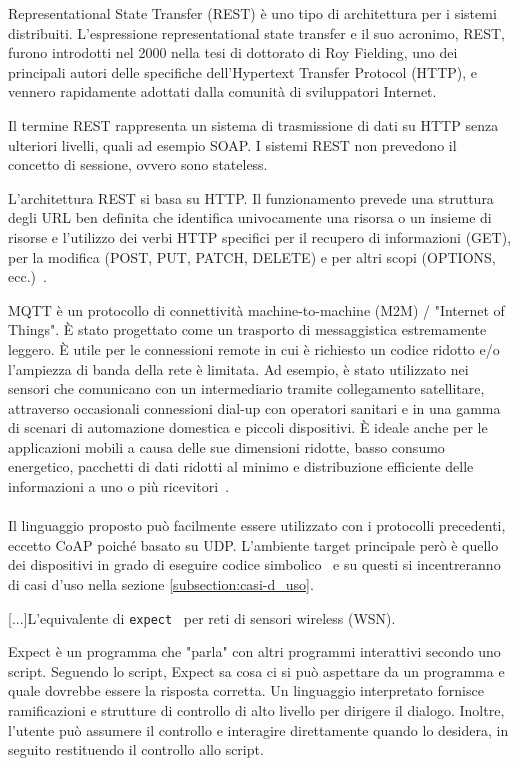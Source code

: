 \documentclass[]{article}
\begin{document}
Representational State Transfer (REST) è uno tipo di architettura per i sistemi distribuiti. L'espressione representational state transfer e il suo acronimo, REST, furono introdotti nel 2000 nella tesi di dottorato di Roy Fielding, uno dei principali autori delle specifiche dell'Hypertext Transfer Protocol (HTTP), e vennero rapidamente adottati dalla comunità di sviluppatori Internet.

Il termine REST rappresenta un sistema di trasmissione di dati su HTTP senza ulteriori livelli, quali ad esempio SOAP. I sistemi REST non prevedono il concetto di sessione, ovvero sono stateless.

L'architettura REST si basa su HTTP. Il funzionamento prevede una struttura degli URL ben definita che identifica univocamente una risorsa o un insieme di risorse e l'utilizzo dei verbi HTTP specifici per il recupero di informazioni (GET), per la modifica (POST, PUT, PATCH, DELETE) e per altri scopi (OPTIONS, ecc.)~\cite{fielding2000architectural}.

MQTT è un protocollo di connettività machine-to-machine (M2M) / "Internet of Things". È stato progettato come un trasporto di messaggistica estremamente leggero. È utile per le connessioni  remote in cui è richiesto un codice ridotto e/o l'ampiezza di banda della rete è limitata. Ad esempio, è stato utilizzato nei sensori che comunicano con un intermediario tramite collegamento satellitare, attraverso occasionali connessioni dial-up con operatori sanitari e in una gamma di scenari di automazione domestica e piccoli dispositivi. È ideale anche per le applicazioni mobili a causa delle sue dimensioni ridotte, basso consumo energetico, pacchetti di dati ridotti al minimo e distribuzione efficiente delle informazioni a uno o più ricevitori~\cite{banks2019mqtt}.\\\\



Il linguaggio proposto può facilmente essere utilizzato con i protocolli precedenti, eccetto CoAP poiché basato su UDP. L'ambiente target principale però è quello dei dispositivi in grado di eseguire codice simbolico~\cite{gaglio2017dc4cd} e su questi si incentreranno di casi d'uso nella sezione \ref{subsection:casi-d_uso}.  

[...]L'equivalente di \texttt{expect}~\cite{libes1991expect, libes1990expect, libes1995exploring} per reti di sensori wireless (WSN).

Expect è un programma che "parla" con altri programmi interattivi secondo uno script. Seguendo lo script, Expect sa cosa ci si può aspettare da un programma e quale dovrebbe essere la risposta corretta. Un linguaggio interpretato fornisce ramificazioni e strutture di controllo di alto livello per dirigere il dialogo. Inoltre, l'utente può assumere il controllo e interagire direttamente quando lo desidera, in seguito restituendo il controllo allo script.
\end{document}
